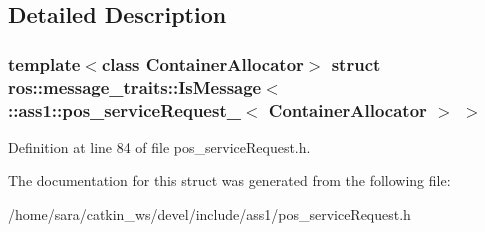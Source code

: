\subsection{Detailed Description}
\subsubsection*{template$<$class Container\+Allocator$>$\newline
struct ros\+::message\+\_\+traits\+::\+Is\+Message$<$ \+::ass1\+::pos\+\_\+service\+Request\+\_\+$<$ Container\+Allocator $>$ $>$}



Definition at line 84 of file pos\+\_\+service\+Request.\+h.



The documentation for this struct was generated from the following file\+:\begin{DoxyCompactItemize}
\item 
/home/sara/catkin\+\_\+ws/devel/include/ass1/pos\+\_\+service\+Request.\+h\end{DoxyCompactItemize}

